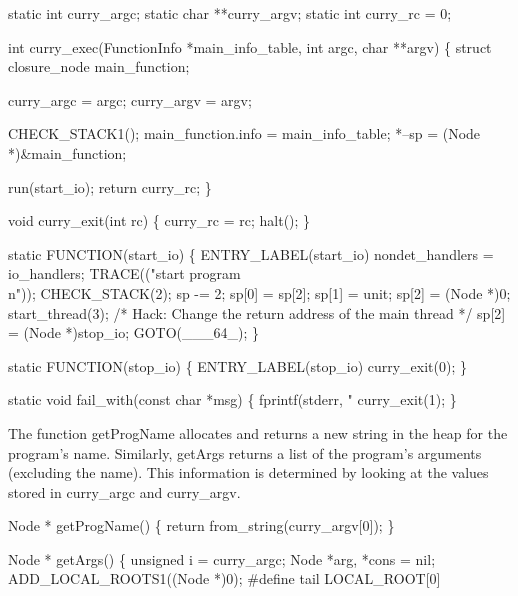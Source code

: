 \nwenddocs{}\plusendmoddef\nwstartdeflinemarkup{}\nwenddeflinemarkup
static int  curry_argc;
static char **curry_argv;
static int  curry_rc = 0;

int
curry_exec(FunctionInfo *main_info_table, int argc, char **argv)
\{
    struct closure_node main_function;

    curry_argc = argc;
    curry_argv = argv;

    CHECK_STACK1();
    main_function.info = main_info_table;
    *--sp = (Node *)&main_function;

    run(start_io);
    return curry_rc;
\}

void
curry_exit(int rc)
\{
    curry_rc = rc;
    halt();
\}

static
FUNCTION(start_io)
\{
 ENTRY_LABEL(start_io)
    nondet_handlers = io_handlers;
    TRACE(("start program\\n"));
    CHECK_STACK(2);
    sp   -= 2;
    sp[0] = sp[2];
    sp[1] = unit;
    sp[2] = (Node *)0;
    start_thread(3);
    /* Hack: Change the return address of the main thread */
    sp[2] = (Node *)stop_io;
    GOTO(___64_);
\}

static
FUNCTION(stop_io)
\{
 ENTRY_LABEL(stop_io)
    curry_exit(0);
\}

static void
fail_with(const char *msg)
\{
    fprintf(stderr, "%
    curry_exit(1);
\}

\nwendcode{}\nwdocspar
The function {\Tt{}getProgName\nwendquote} allocates and returns a new string in the
heap for the program's name. Similarly, {\Tt{}getArgs\nwendquote} returns a list of
the program's arguments (excluding the name). This information is
determined by looking at the values stored in {\Tt{}curry{\_}argc\nwendquote} and
{\Tt{}curry{\_}argv\nwendquote}.

\nwenddocs{}\plusendmoddef\nwstartdeflinemarkup{}\nwenddeflinemarkup
Node *
getProgName()
\{
    return from_string(curry_argv[0]);
\}

Node *
getArgs()
\{
    unsigned i = curry_argc;
    Node     *arg, *cons = nil;
    ADD_LOCAL_ROOTS1((Node *)0);
#define tail LOCAL_ROOT[0]

